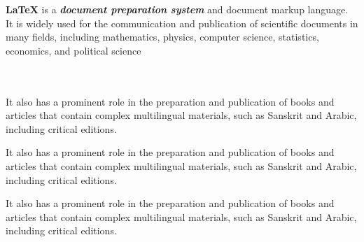 \documentclass{report}
\begin{document}
\textbf{LaTeX} is a \textbf{\textit{document preparation system}} and document markup language. It is widely used for the communication and publication of scientific documents in many fields, including mathematics, physics, computer science, statistics, economics, and political science 
\\ %
\\ %
\\ %

\begin{flushleft}
It also has a prominent role in the preparation and publication of books and articles that contain complex multilingual materials, such as Sanskrit and Arabic, including critical editions.  
\end{flushleft}

\begin{flushright}
It also has a prominent role in the preparation and publication of books and articles that contain complex multilingual materials, such as Sanskrit and Arabic, including critical editions.  
\end{flushright}

\begin{center}
It also has a prominent role in the preparation and publication of books and articles that contain complex multilingual materials, such as Sanskrit and Arabic, including critical editions.  
\end{center}
\end{document}
